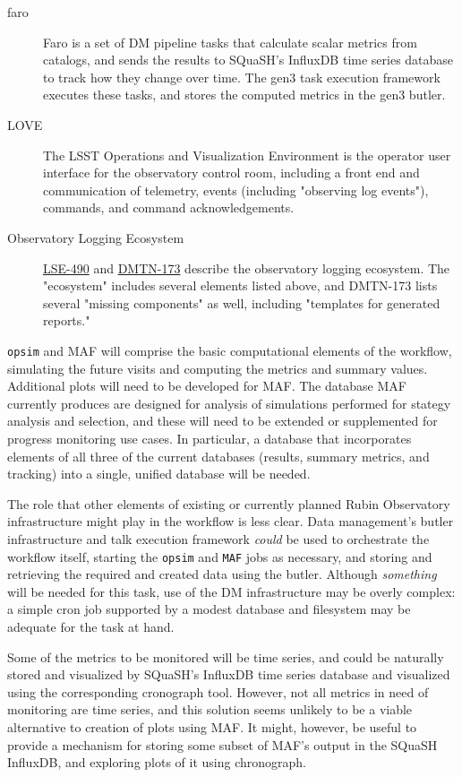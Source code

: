 \begin{description}
\begin{description}
\end{description}
\item[{faro}] Faro is a set of DM pipeline tasks that calculate scalar metrics from catalogs, and sends the results to SQuaSH's InfluxDB time series database to track how they change over time. The gen3 task execution framework executes these tasks, and stores the computed metrics in the gen3 butler.
\item[{LOVE}] The LSST Operations and Visualization Environment is the operator user interface for the observatory control room, including a front end and communication of telemetry, events (including "observing log events"), commands, and command acknowledgements.
\item[{Observatory Logging Ecosystem}] \href{https://ls.st/lse-490}{LSE-490} and \href{https://dmtn-173.lsst.io/}{DMTN-173} describe the observatory logging ecosystem. The "ecosystem" includes several elements listed above, and DMTN-173 lists several "missing components" as well, including "templates for generated reports."
\end{description}

\texttt{opsim} and MAF will comprise the basic computational elements of the workflow, simulating the future visits and computing the metrics and summary values. Additional plots will need to be developed for MAF. The database MAF currently produces are designed for analysis of simulations performed for stategy analysis and selection, and these will need to be extended or supplemented for progress monitoring use cases. In particular, a database that incorporates elements of all three of the current databases (results, summary metrics, and tracking) into a single, unified database will be needed.

The role that other elements of existing or currently planned Rubin Observatory infrastructure might play in the workflow is less clear. Data management's butler infrastructure and talk execution framework \emph{could} be used to orchestrate the workflow itself, starting the \texttt{opsim} and \texttt{MAF} jobs as necessary, and storing and retrieving the required and created data using the butler. Although \emph{something} will be needed for this task, use of the DM infrastructure may be overly complex: a simple cron job supported by a modest database and filesystem may be adequate for the task at hand. 

Some of the metrics to be monitored will be time series, and could be naturally stored and visualized by SQuaSH's InfluxDB time series database and visualized using the corresponding cronograph tool. However, not all metrics in need of monitoring are time series, and this solution seems unlikely to be a viable alternative to creation of plots using MAF. It might, however, be useful to provide a mechanism for storing some subset of MAF's output in the SQuaSH InfluxDB, and exploring plots of it using chronograph.

